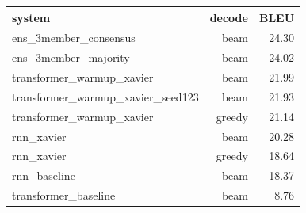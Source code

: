 \begin{tabular}{lrr}
\toprule
system & decode & BLEU \\
\midrule
ens\_3member\_consensus & beam & 24.30 \\
ens\_3member\_majority & beam & 24.02 \\
transformer\_warmup\_xavier & beam & 21.99 \\
transformer\_warmup\_xavier\_seed123 & beam & 21.93 \\
transformer\_warmup\_xavier & greedy & 21.14 \\
rnn\_xavier & beam & 20.28 \\
rnn\_xavier & greedy & 18.64 \\
rnn\_baseline & beam & 18.37 \\
transformer\_baseline & beam & 8.76 \\
\bottomrule
\end{tabular}
